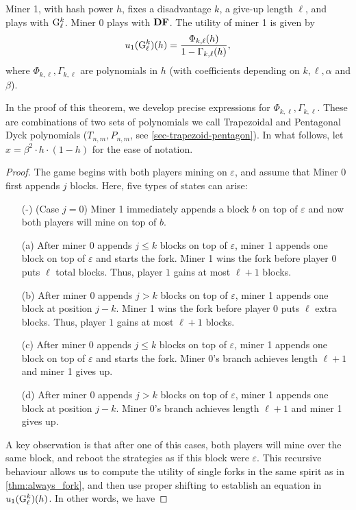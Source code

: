 \begin{mythm}
Miner 1, with hash power $h$, fixes a disadvantage $k$, a give-up length
$\ell$, and plays with ${\rm {G}}^k_\ell$. Miner 0 plays with $\text{\rm {\bf DF}}$. 
The utility of miner 1 is given by
$$
u_1({\rm {G}}^k_\ell)(h) = \frac{\Phi_{k,\ell}(h)}{1-\Gamma_{k,\ell}(h)},
$$
where $\Phi_{k,\ell},\Gamma_{k,\ell}$ are polynomials in $h$ (with coefficients depending on $k,\ell,\alpha$ and $\beta$).
\end{mythm}
In the proof of this theorem, we develop precise expressions for
$\Phi_{k,\ell}, \Gamma_{k,\ell}$. These are combinations of two sets of
polynomials we call Trapezoidal and Pentagonal Dyck polynomials ($T_{n,m},
P_{n,m}$, see \ref{sec-trapezoid-pentagon}). In what follows, let $x = \beta^2
\cdot h \cdot (1 - h)$ for the ease of notation.
\begin{proof}
The game begins with both players mining on $\varepsilon$, and assume that
Miner 0 first appends $j$ blocks. Here, five types of states can arise:
\begin{itemize}
    \item[(-)] (Case $j=0$) Miner 1 immediately appends a block $b$ on top of
        $\varepsilon$ and now both players will mine on top of $b$.
    \item[(a)] After miner 0 appends $j\leq k$ blocks on top of $\varepsilon$,
        miner 1 appends one block on top of $\varepsilon$ and starts the fork.
        Miner 1 wins the fork before player $0$ puts $\ell$ total blocks. Thus, player $1$ gains at most $\ell+1$ blocks.
    \item[(b)] After miner 0 appends $j > k$ blocks on top of $\varepsilon$,
        miner 1 appends one block at position $j-k$. Miner 1 wins the fork before player $0$ puts $\ell$ extra blocks. 
        Thus, player $1$ gains at most $\ell+1$ blocks.  \item[(c)] After miner 0 appends
        $j\leq k$ blocks on top of $\varepsilon$, miner 1 appends one block on
        top of $\varepsilon$ and starts the fork. Miner 0's branch achieves
        length $\ell+1$ and miner 1 gives up.  \item[(d)] After miner 0 appends
$j > k$ blocks on top of $\varepsilon$, miner 1 appends one block at position
$j-k$. Miner 0's branch achieves length $\ell+1$ and miner 1 gives up.
\end{itemize}

A key observation is that after one of this cases, both players will mine over
the same block, and reboot the strategies as if this block were $\varepsilon$.
This recursive behaviour allows us to compute the utility of single forks in
the same spirit as in \ref{thm:always_fork}, and then use proper shifting to
establish an equation in $u_1({\rm {G}}^k_\ell)(h)$. In other words, we have


\end{proof}
